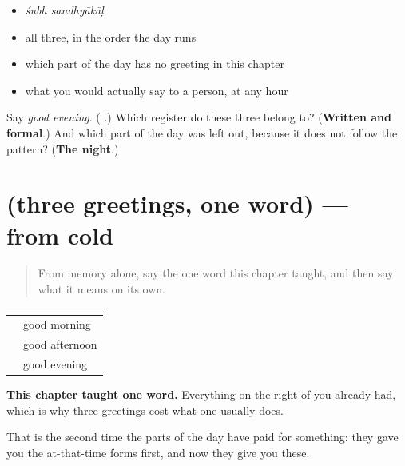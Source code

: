 \begin{itemize}
\raggedright
  \item \emph{śubh sandhyākāḷ}
  \item all three, in the order the day runs
  \item which part of the day has no greeting in this chapter
  \item what you would actually say to a person, at any hour
\end{itemize}

\begin{tcolorbox}[breakable,colback=teal!4,colframe=teal!35!black,title={Before you move on}]
Say \emph{good evening}. (\emph{\textbf{ }}.) Which register do these three belong to? (\textbf{Written and formal}.) And which part of the day was left out, because it does not follow the pattern? (\textbf{The night}.)
\end{tcolorbox}
\section[(three greetings, one word)]{(three greetings, one word) — from cold}

\label{lesson:MR-R68-greetings-recall}



\begin{quote}
From memory alone, say the one word this chapter taught, and then say what it means on its own.
\end{quote}

\begin{grammarlens}[title={Grammar Lens: one word, three greetings}]
\noindent
\begin{tabularx}{\linewidth}{@{}>{\raggedright\arraybackslash}X>{\raggedright\arraybackslash}X@{}}
\toprule
\textbf{} & \textbf{} \\
\midrule
\textbf{\mr{शुभ} \mr{सकाळ}} & good morning \\
\textbf{\mr{शुभ} \mr{दुपार}} & good afternoon \\
\textbf{\mr{शुभ} \mr{संध्याकाळ}} & good evening \\
\bottomrule
\end{tabularx}

\textbf{This chapter taught one word.} Everything on the right of \textbf{} you already had, which is why three greetings cost what one usually does.

That is the second time the parts of the day have paid for something: they gave you the at-that-time forms first, and now they give you these.
\end{grammarlens}

